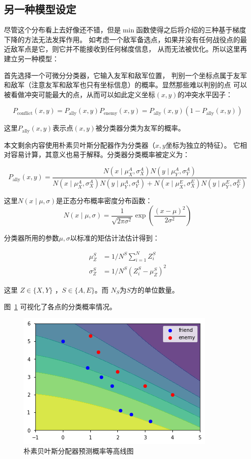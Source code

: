 \documentclass{sicnuthesis}
\begin{document}
\subsection{另一种模型设定}


尽管这个分布看上去好像还不错，但是$\min$函数使得之后将介绍的三种基于梯度下降的方法无法发挥作用。
如考虑一个敌军备选点，如果并没有任何战役点的最近敌军点是它，则它并不能接收到任何梯度信息，
从而无法被优化。所以这里再建立另一种模型：

首先选择一个可微分分类器，它输入友军和敌军位置，
判别一个坐标点属于友军和敌军（注意友军和敌军也只有坐标信息）的概率。显然那些难以判别的点
可以被看做冲突可能最大的点，从而可以如此定义坐标$(x,y)$的冲突水平因子：

$$
P_{\text{conflict}}(x,y) = P_\text{ally}(x,y) P_\text{enemy}(x,y) = P_\text{ally}(x,y)(1-P_\text{ally}(x,y))
$$


这里$P_\text{ally}(x,y)$表示点$(x,y)$被分类器分类为友军的概率。

本文剩余内容使用朴素贝叶斯分配器作为分类器（$x,y$坐标为独立的特征）。
它相对容易计算，其意义也易于解释。分类器分类概率被定义为：

$$
P_\text{ally}(x,y) = \frac{
N(x\mid \mu^A_X ,\sigma^A_X) N(y \mid \mu^A_Y, \sigma^A_Y)
}{
N(x \mid \mu^A_X , \sigma^A_X) N(y \mid \mu^A_Y , \sigma^A_Y) + 
N(x \mid \mu^E_X , \sigma^E_X) N(y \mid \mu^E_Y , \sigma^E_Y)
}
$$


这里$N(x \mid \mu,\sigma)$是正态分布概率密度分布函数：
$$
N(x \mid \mu,\sigma) = \frac{1}{\sqrt{2\pi \sigma^2}} \exp\left(\frac{(x-\mu)^2}{2\sigma^2}\right)
$$


分类器所用的参数$\mu,\sigma$以标准的矩估计法估计得到：

\begin{align*}
\mu_Z^S    &= 1/N^S \sum_{i=1}^N Z_i^S \\
\sigma_Z^S &= 1/N^S (Z_i^S - \mu_Z^S)^2
\end{align*}


这里 $Z \in \{ X,Y \}$ ，$S \in \{ A,E \}$。而 $N_S$为$S$方的单位数量。

图~\ref{fig:naivebayes} 可视化了各点的分类概率情况。

\begin{figure}[htb]
\includegraphics[width=0.6\linewidth]{naivebayes.png}
\caption{朴素贝叶斯分配器预测概率等高线图}
\label{fig:naivebayes}
\end{figure}
\end{document}
